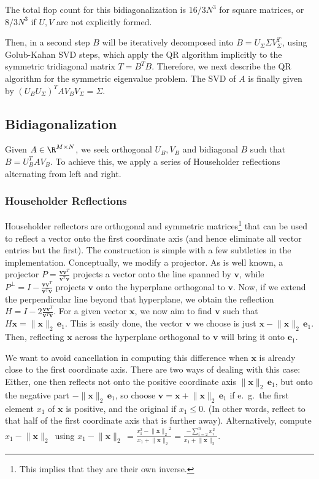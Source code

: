 \documentclass[11pt]{article}
\newcommand{\ve}[1]{\ensuremath{\mathbf{#1}}}
\newcommand{\tnorm}[1]{\ensuremath{\lVert{\ve{#1}}\rVert_2\,}}
\newcommand{\tnormns}[1]{\ensuremath{\lVert{\ve{#1}}\rVert_2}}
\newcommand{\sfrac}[2]{\ensuremath{{\scriptstyle\frac{\scriptstyle #1}{\scriptstyle #2}}}}
\begin{document}
The total flop count for this bidiagonalization is $16/3 N^3$ for square matrices, or $8/3 N^3$ if $U,V$ are not explicitly formed.

Then, in a second step $B$ will be iteratively decomposed into $B=U_\Sigma\Sigma V_\Sigma^T$, using Golub-Kahan SVD steps, which apply the QR algorithm implicitly to the symmetric tridiagonal matrix $T=B^TB$. Therefore, we next describe the QR algorithm for the symmetric eigenvalue problem. The SVD of $A$ is finally given by $(U_BU_\Sigma)^T A V_B V_\Sigma = \Sigma$.

\subsection{Bidiagonalization}
Given $A \in\R^{M\times N}$, we seek orthogonal $U_B, V_B$ and bidiagonal $B$ such that $B = U_B^T A V_B$. To achieve this, we apply a series of Householder reflections alternating from left and right.

\subsubsection{Householder Reflections}
Householder reflectors are orthogonal and symmetric matrices\footnote{This implies that they are their own inverse.} that can be used to reflect a vector onto the first coordinate axis (and hence eliminate all vector entries but the first). The construction is simple with a few subtleties in the implementation. Conceptually, we modify a projector. As is well known, a projector $P =\sfrac{\ve v\ve v^T}{\ve v^T\ve v}$ projects a vector onto the line spanned by $\ve v$, while $P^\bot = I - \sfrac{\ve v\ve v^T}{\ve v^T\ve v}$ projects $\ve v$ onto the hyperplane orthogonal to $\ve v$. Now, if we extend the perpendicular line beyond that hyperplane, we obtain the reflection $H = I - 2\sfrac{\ve v\ve v^T}{\ve v^T\ve v}$. For a given vector $\ve x$, we now aim to find $\ve v$ such that $H\ve x=\tnorm x\ve e_1$. This is easily done, the vector \ve v we choose is just $\ve x -\tnorm x \ve e_1$. Then, reflecting \ve x across the hyperplane orthogonal to \ve v will bring it onto $\ve e_1$.

We want to avoid cancellation in computing this difference when \ve x is already close to the first coordinate axis. There are two ways of dealing with this case: Either, one then reflects not onto the positive coordinate axis $\tnorm x \ve e_1$, but onto the negative part $-\tnorm x \ve e_1$, so choose $\ve v = \ve x + \tnorm x \ve e_1$ if e.~g.\ the first element $x_1$ of \ve x is positive, and the original if $x_1\le 0$. (In other words, reflect to that half of the first coordinate axis that is further away).
Alternatively, compute $x_1 - \tnorm x$ using $x_1 - \tnorm x = \frac{x_1^2 - \tnormns x^2}{x_1 + \tnorm x}=\frac{-\sum_{i=2}^n x_i^2}{x_1 + \tnorm x}$.
\end{document}
